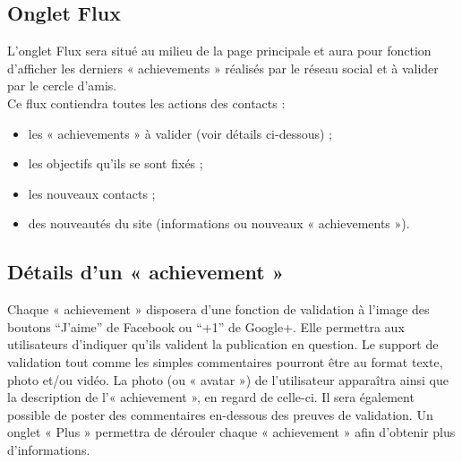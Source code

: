 \documentclass{life-fr}
\begin{document}
\subsection{Onglet Flux}

L'onglet Flux sera situé au milieu de la page principale et aura pour fonction d'afficher les derniers « achievements » réalisés par le réseau social et à valider par le cercle d'amis.\\

Ce flux contiendra toutes les actions des contacts :

\begin{itemize}
  \item les « achievements » à valider (voir détails ci-dessous) ;
  \item les objectifs qu'ils se sont fixés ;
  \item les nouveaux contacts ;
  \item des nouveautés du site (informations ou nouveaux « achievements »).
\end{itemize}

\newpage

\subsection{Détails d'un « achievement »}

Chaque « achievement » disposera d'une fonction de validation à l'image des boutons ``J'aime'' de Facebook ou ``+1'' de Google+. Elle permettra aux utilisateurs d'indiquer qu'ils valident la publication en question. Le support de validation tout comme les simples commentaires pourront être au format texte, photo et/ou vidéo. La photo (ou « avatar ») de l'utilisateur apparaîtra ainsi que la description de l'« achievement », en regard de celle-ci. Il sera également possible de poster des commentaires en-dessous des preuves de validation. Un onglet « Plus » permettra de dérouler chaque « achievement » afin d'obtenir plus d'informations.\\
\end{document}
